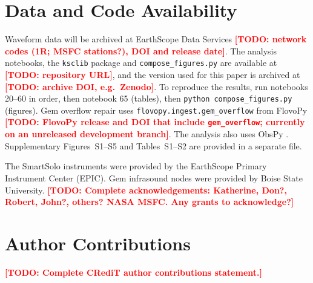\documentclass[]{seismica}
\newcommand{\todo}[1]{\textcolor{red}{\textbf{[TODO: #1]}}}
\begin{document}
\section*{Data and Code Availability}

Waveform data will be archived at EarthScope Data Services
\todo{network codes (1R; MSFC stations?), DOI and release date}. The
analysis notebooks, the \texttt{ksclib} package and
\texttt{compose\_figures.py} are available at \todo{repository URL},
and the version used for this paper is archived at \todo{archive DOI,
e.g.\ Zenodo}. To reproduce the results, run notebooks 20--60 in order,
then notebook 65 (tables), then \texttt{python compose\_figures.py}
(figures). Gem overflow repair uses \texttt{flovopy.ingest.gem\_overflow}
from FlovoPy \citep{flovopy_2026} \todo{FlovoPy release and DOI that
include \texttt{gem\_overflow}; currently on an unreleased development
branch}. The analysis also uses ObsPy
\citep{Beyreuther2010,krischer_obspy_2015}. Supplementary Figures~S1--S5
and Tables~S1--S2 are provided in a separate file.

\begin{acknowledgements}
The SmartSolo instruments were provided by the EarthScope Primary
Instrument Center (EPIC). Gem infrasound nodes were provided by Boise
State University. \todo{Complete acknowledgements: Katherine, Don?,
Robert, John?, others? NASA MSFC. Any grants to acknowledge?}
\end{acknowledgements}

\section*{Author Contributions}

\todo{Complete CRediT author contributions statement.}

\end{document}

